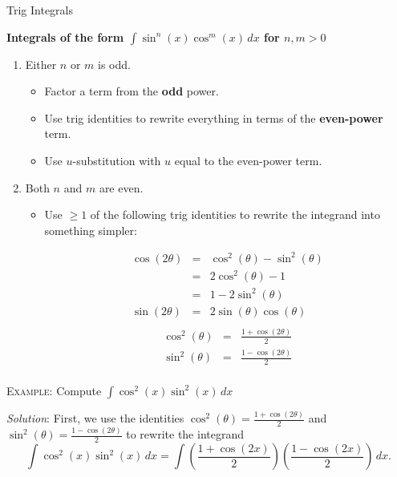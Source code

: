 \documentclass[12pt]{article}
\begin{document}
	\noindent\begin{center}\Large{Trig Integrals}\end{center}
	\vspace{0.25in}
	\noindent\textbf{Integrals of the form $\int\sin^n(x)\cos^m(x)\,dx$ for $n,m>0$}
	\begin{enumerate}
		\item Either $n$ or $m$ is odd.
		\begin{itemize}
			\item Factor a term from the \textbf{odd} power.
			\item Use trig identities to rewrite everything in terms of the \textbf{even-power} term.
			\item Use $u$-substitution with $u$ equal to the even-power term.
		\end{itemize}
		\item Both $n$ and $m$ are even.
		\begin{itemize}
			\item Use $\geq 1$ of the following trig identities to rewrite the integrand into something simpler:
			\vspace{-10mm}
			\begin{multicols}{2}
			\def\arraystretch{1.5}
			$$\begin{array}{rcl}
				\cos(2\theta) & = & \cos^2(\theta)-\sin^2(\theta)\\
				& = & 2\cos^2(\theta)-1 \\
				& = & 1 - 2\sin^2(\theta)\\[1.5mm]
				\sin(2\theta) & = & 2\sin(\theta)\cos(\theta)
			\end{array}$$
			\def\arraystretch{1.5}
			$$\begin{array}{rcl}
				& & \\
				\cos^2(\theta) & = & \frac{1+\cos(2\theta)}{2}\\[3mm]
				\sin^2(\theta) & = & \frac{1-\cos(2\theta)}{2}\\
				& &
			\end{array}$$
			\end{multicols}
		\end{itemize}
	\end{enumerate}
		
	\noindent\textsc{Example}: Compute $\int\cos^2(x)\sin^2(x)\,dx$
	
	\noindent\textit{Solution}: First, we use the identities $\cos^2(\theta) = \frac{1+\cos(2\theta)}{2}$ and $\sin^2(\theta) = \frac{1-\cos(2\theta)}{2}$ to rewrite the integrand
	$$\int\cos^2(x)\sin^2(x)\,dx=\int\left(\frac{1+\cos(2x)}{2}\right)\left(\frac{1-\cos(2x)}{2}\right)\,dx.$$
	
\end{document}
